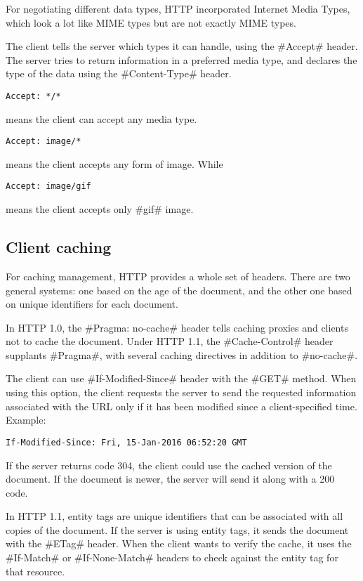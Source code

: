 \documentclass[a4paper]{article}
\begin{document}
For negotiating different data types, HTTP incorporated Internet Media Types,
which look a lot like MIME types but are not exactly MIME types.

The client tells the server which types it can handle, using the #Accept# header.
The server tries to return information in a preferred media type,
and declares the type of the data using the #Content-Type# header.
\begin{verbatim}
Accept: */*
\end{verbatim}
means the client can accept any media type.
\begin{verbatim}
Accept: image/*
\end{verbatim}
means the client accepts any form of image.
While
\begin{verbatim}
Accept: image/gif
\end{verbatim}
means the client accepts only #gif# image.

\subsection{Client caching}

For caching management, HTTP provides a whole set of headers.
There are two general systems: one based on the age of the document,
and the other one based on unique identifiers for each document.

In HTTP 1.0, the #Pragma: no-cache# header tells caching proxies and clients not to cache the document.
Under HTTP 1.1, the #Cache-Control# header supplants #Pragma#,
with several caching directives in addition to #no-cache#.

The client can use #If-Modified-Since# header with the #GET# method.
When using this option, the client requests the server to send the requested information associated with the URL
only if it has been modified since a client-specified time. Example:
\begin{verbatim}
If-Modified-Since: Fri, 15-Jan-2016 06:52:20 GMT
\end{verbatim}
If the server returns code 304, the client could use the cached version of the document.
If the document is newer, the server will send it along with a 200 code.

In HTTP 1.1, entity tags are unique identifiers that can be associated with all copies of the document.
If the server is using entity tags, it sends the document with the #ETag# header.
When the client wants to verify the cache,
it uses the #If-Match# or #If-None-Match# headers to check against the entity tag for that resource.
\end{document}

